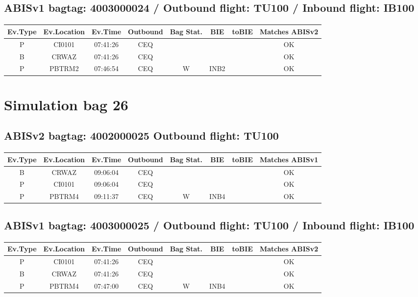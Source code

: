 \documentclass{report}
\begin{document}
\subsection*{ABISv1 bagtag: 4003000024 / Outbound flight: TU100 / Inbound flight: IB100}
\paragraph{}
\begin{longtable}{cccccccc}    \toprule
\rowcolor{white!50}
\textbf{Ev.Type} & \textbf{Ev.Location} & \textbf{Ev.Time} & \textbf{Outbound} & \textbf{Bag Stat.} & \textbf{BIE} & \textbf{toBIE} & \textbf{Matches ABISv2} \\\midrule
P & CI0101 & 07:41:26  & CEQ &  &  &  & OK\\
B & CRWAZ & 07:41:26  & CEQ &  &  &  & OK\\
P & PBTRM2 & 07:46:54  & CEQ & W & INB2 &  & OK\\
\bottomrule
\end{longtable}
\pagebreak
\section*{Simulation bag 26}
\subsection*{ABISv2 bagtag: 4002000025 Outbound flight: TU100}
\paragraph{}
\begin{longtable}{cccccccc}    \toprule
\rowcolor{white!50}
\textbf{Ev.Type} & \textbf{Ev.Location} & \textbf{Ev.Time} & \textbf{Outbound} & \textbf{Bag Stat.} & \textbf{BIE} & \textbf{toBIE} & \textbf{Matches ABISv1} \\\midrule
B & CRWAZ & 09:06:04  & CEQ &  &  &  & OK\\
P & CI0101 & 09:06:04  & CEQ &  &  &  & OK\\
P & PBTRM4 & 09:11:37  & CEQ & W & INB4 &  & OK\\
\bottomrule
\end{longtable}
\subsection*{ABISv1 bagtag: 4003000025 / Outbound flight: TU100 / Inbound flight: IB100}
\paragraph{}
\begin{longtable}{cccccccc}    \toprule
\rowcolor{white!50}
\textbf{Ev.Type} & \textbf{Ev.Location} & \textbf{Ev.Time} & \textbf{Outbound} & \textbf{Bag Stat.} & \textbf{BIE} & \textbf{toBIE} & \textbf{Matches ABISv2} \\\midrule
P & CI0101 & 07:41:26  & CEQ &  &  &  & OK\\
B & CRWAZ & 07:41:26  & CEQ &  &  &  & OK\\
P & PBTRM4 & 07:47:00  & CEQ & W & INB4 &  & OK\\
\bottomrule
\end{longtable}
\pagebreak
\end{document}
